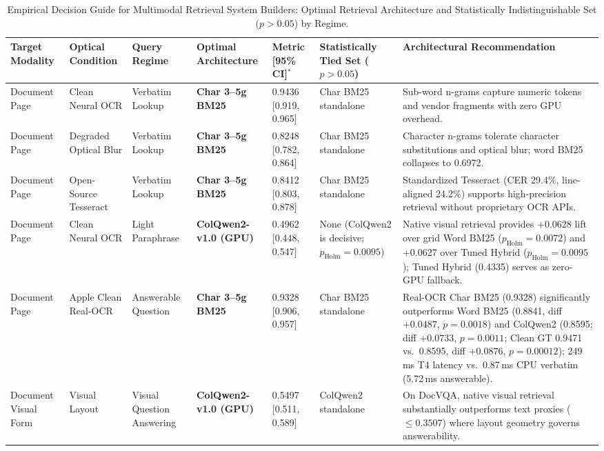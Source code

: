 \begin{table}[t]
\centering\footnotesize
\setlength{\tabcolsep}{2.5pt}
\caption{Empirical Decision Guide for Multimodal Retrieval System Builders: Optimal Retrieval Architecture and Statistically Indistinguishable Set ($p > 0.05$) by Regime.}\label{tab:decision_guide_v6}
\begin{tabular}{@{}p{1.6cm}p{1.8cm}p{1.8cm}p{2.1cm}p{1.8cm}p{2.3cm}p{4.1cm}@{}}
\toprule
\textbf{Target Modality} & \textbf{Optical Condition} & \textbf{Query Regime} & \textbf{Optimal Architecture} & \textbf{Metric [95\% CI]}$^*$ & \makecell[c]{\textbf{Statistically}\\\textbf{Tied Set}\\\scriptsize($p > 0.05$)} & \textbf{Architectural Recommendation} \\
\midrule
Document Page & Clean Neural OCR & Verbatim Lookup & \textbf{Char 3--5g BM25} & 0.9436 [0.919, 0.965] & Char BM25 standalone & Sub-word n-grams capture numeric tokens and vendor fragments with zero GPU overhead. \\
Document Page & Degraded Optical Blur & Verbatim Lookup & \textbf{Char 3--5g BM25} & 0.8248 [0.782, 0.864] & Char BM25 standalone & Character n-grams tolerate character substitutions and optical blur; word BM25 collapses to 0.6972. \\
Document Page & Open-Source Tesseract & Verbatim Lookup & \textbf{Char 3--5g BM25} & 0.8412 [0.803, 0.878] & Char BM25 standalone & Standardized Tesseract (CER 29.4\%, line-aligned 24.2\%) supports high-precision retrieval without proprietary OCR APIs. \\
Document Page & Clean Neural OCR & Light Paraphrase & \textbf{ColQwen2-v1.0 (GPU)} & 0.4962 [0.448, 0.547] & None (ColQwen2 is decisive; $p_{\text{Holm}} = 0.0095$) & Native visual retrieval provides +0.0628 lift over grid Word BM25 ($p_{\text{Holm}} = 0.0072$) and +0.0627 over Tuned Hybrid ($p_{\text{Holm}} = 0.0095$); Tuned Hybrid (0.4335) serves as zero-GPU fallback. \\
Document Page & Apple Clean Real-OCR & Answerable Question & \textbf{Char 3--5g BM25} & 0.9328 [0.906, 0.957] & Char BM25 standalone & Real-OCR Char BM25 (0.9328) significantly outperforms Word BM25 (0.8841, diff $+0.0487$, $p=0.0018$) and ColQwen2 (0.8595; diff $+0.0733$, $p = 0.0011$; Clean GT 0.9471 vs.\ 0.8595, diff $+0.0876$, $p=0.00012$); 249\,ms T4 latency vs.\ 0.87\,ms CPU verbatim (5.72\,ms answerable). \\
Document Visual Form & Visual Layout & Visual Question Answering & \textbf{ColQwen2-v1.0 (GPU)} & 0.5497 [0.511, 0.589] & ColQwen2 standalone & On DocVQA, native visual retrieval substantially outperforms text proxies ($\le 0.3507$) where layout geometry governs answerability. \\

\end{tabular}
\end{table}

